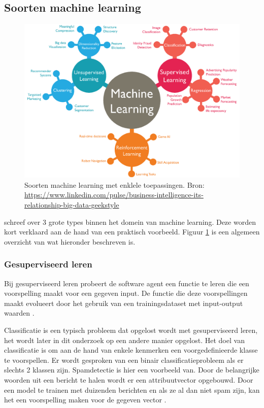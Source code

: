 \subsection{Soorten machine learning}
\label{subsec:soorten-machine-learning}

\begin{figure}
    \includegraphics[width=\linewidth]{img/ml-soorten.png}
    \caption{Soorten machine learning met enklele toepassingen. Bron: \url{https://www.linkedin.com/pulse/business-intelligence-its-relationship-big-data-geekstyle}}
    \label{fig:ml-soorten}
\end{figure}

\textcite{Lievens2019} schreef over 3 grote types binnen het domein van machine learning. Deze worden kort verklaard aan de hand van een praktisch voorbeeld. Figuur \ref{fig:ml-soorten} is een algemeen overzicht van wat hieronder beschreven is.


\subsubsection{Gesuperviseerd leren}
\label{subsubsec:gesuperviseerd-leren}

Bij gesuperviseerd leren probeert de software agent een functie te leren die een voorspelling maakt voor een gegeven input. De functie die deze voorspellingen maakt evolueert door het gebruik van een trainingsdataset met input-output waarden \autocite{Norvig1994}.

Classificatie is een typisch probleem dat opgelost wordt met gesuperviseerd leren, het wordt later in dit onderzoek op een andere manier opgelost. Het doel van classificatie is om aan de hand van enkele kenmerken een voorgedefinieerde klasse te voorspellen. Er wordt gesproken van een binair classificatieprobleem als er slechts 2 klassen zijn. Spamdetectie is hier een voorbeeld van. Door de belangrijke woorden uit een bericht te halen wordt er een attribuutvector opgebouwd. Door een model te trainen met duizenden berichten en als ze al dan niet spam zijn, kan het een voorspelling maken voor de gegeven vector \autocite{Lievens2019}.

